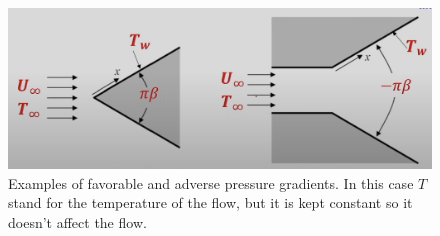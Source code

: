 \documentclass{article}
\begin{document}
\begin{figure}
    \centering
    \includegraphics[width=\textwidth]{Wedges Examples.png}
    \caption{Examples of favorable and adverse pressure gradients. In this case $T$ stand for the temperature of the flow, but it is kept constant so it doesn't affect the flow.}
    \label{fig:Wedges Examples}
\end{figure}
\end{document}
